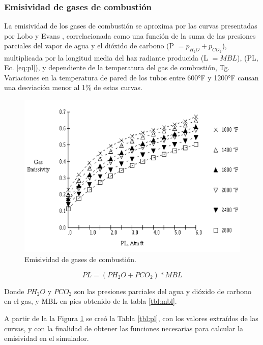 \subsubsection{Emisividad de gases de combustión}
\par La emisividad de los gases de combustión se aproxima por las curvas presentadas por Lobo y Evans \cite{bib:rad}, correlacionada como una función de la suma de las presiones parciales del vapor de agua y el dióxido de carbono (P $= p_{H_2O} + p_{CO_2}$), multiplicada por la longitud media del haz radiante producida (L $= MBL$), (PL, Ec. \ref{eq:pl}), y dependiente de la temperatura del gas de combustión, Tg. Variaciones en la temperatura de pared de los tubos entre 600°F y 1200°F causan una desviación menor al 1\% de estas curvas.
\begin{figure}[H]
\begin{center}
\includegraphics[scale=0.42]{images/emiss}
\caption[Emisividad de gases de combustión]{Emisividad de gases de combustión.\cite{bib:mekler}}
\label{fig:emiss}
\end{center}
\end{figure}
\begin{equation}
\label{eq:pl}
PL = (PH_2O + PCO_2) * MBL
\end{equation}
\par Donde $PH_2O$ y $PCO_2$ son las presiones parciales del agua y dióxido de carbono en el gas, y MBL en pies obtenido de la tabla \ref{tbl:mbl}.
\par A partir de la la Figura \ref{fig:emiss} se creó la Tabla \ref{tbl:pl}, con los valores extraídos de las curvas, y con la finalidad de obtener las funciones necesarias para calcular la emisividad en el simulador.
